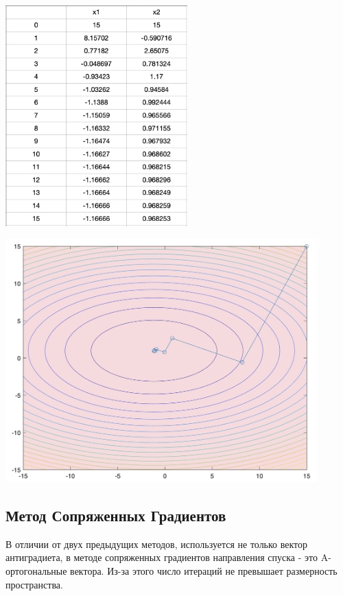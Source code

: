 \documentclass[a4paper,12pt]{article}
\begin{document}
 \begin{center}
\includegraphics[width=70mm]{table_2.png}

{\includegraphics[width=120mm]{plot_2.png}}
 \end{center}

\clearpage

\subsection{Метод Сопряженных Градиентов}

В отличии от двух предыдущих методов, используется не только вектор антиградиета, в методе сопряженных градиентов направления спуска - это A-ортогональные вектора. Из-за этого число итераций не превышает размерность пространства.
\end{document}
